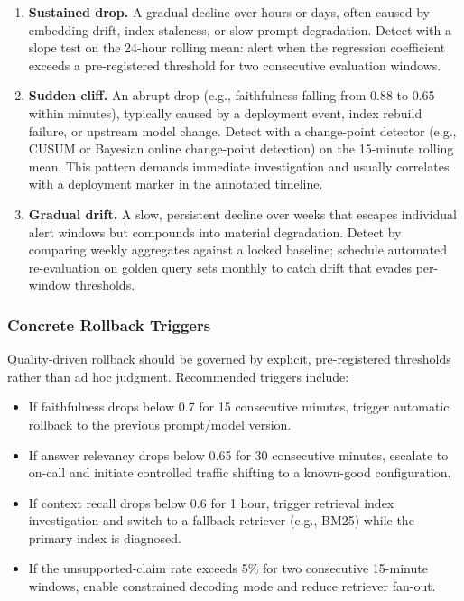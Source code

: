 \begin{enumerate}
    \item \textbf{Sustained drop.} A gradual decline over hours or days, often caused by embedding drift, index staleness, or slow prompt degradation. Detect with a slope test on the 24-hour rolling mean: alert when the regression coefficient exceeds a pre-registered threshold for two consecutive evaluation windows.
    \item \textbf{Sudden cliff.} An abrupt drop (e.g., faithfulness falling from 0.88 to 0.65 within minutes), typically caused by a deployment event, index rebuild failure, or upstream model change. Detect with a change-point detector (e.g., CUSUM or Bayesian online change-point detection) on the 15-minute rolling mean. This pattern demands immediate investigation and usually correlates with a deployment marker in the annotated timeline.
    \item \textbf{Gradual drift.} A slow, persistent decline over weeks that escapes individual alert windows but compounds into material degradation. Detect by comparing weekly aggregates against a locked baseline; schedule automated re-evaluation on golden query sets monthly to catch drift that evades per-window thresholds.
\end{enumerate}

\subsubsection{Concrete Rollback Triggers}
Quality-driven rollback should be governed by explicit, pre-registered thresholds rather than ad hoc judgment. Recommended triggers include:

\begin{itemize}
    \item If faithfulness drops below 0.7 for 15 consecutive minutes, trigger automatic rollback to the previous prompt/model version.
    \item If answer relevancy drops below 0.65 for 30 consecutive minutes, escalate to on-call and initiate controlled traffic shifting to a known-good configuration.
    \item If context recall drops below 0.6 for 1 hour, trigger retrieval index investigation and switch to a fallback retriever (e.g., BM25) while the primary index is diagnosed.
    \item If the unsupported-claim rate exceeds 5\% for two consecutive 15-minute windows, enable constrained decoding mode and reduce retriever fan-out.
\end{itemize}

